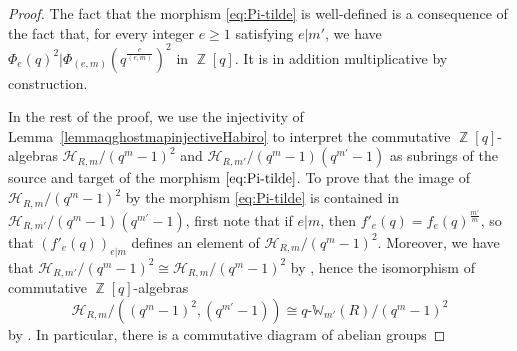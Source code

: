 \documentclass[10pt,twoside]{scrarticle}
\theoremstyle{definition}
\DeclareMathOperator{\Z}{\mathbb{Z}}
\newcommand{\qWmm}{q\text{-}\mathbb{W}_{m'}}
\renewcommand{\ge}{\geqslant}
\numberwithin{equation}{theorem}
\begin{document}
\begin{proof}
    The fact that the morphism \eqref{eq:Pi-tilde} is well-defined is a consequence of the fact that, for every integer $e \ge 1$ satisfying $e|m'$, we have $\Phi_e(q)^2|\Phi_{(e,m)}(q^{\frac{e}{(e,m)}})^2$ in $\Z[q]$. It is in addition multiplicative by construction. 
    
    In the rest of the proof, we use the injectivity of Lemma~\ref{lemmaqghostmapinjectiveHabiro} to interpret the commutative $\Z[q]$\nobreakdash-algebras \hbox{$\mathcal{H}_{R,m}/(q^m-1)^2$} and $\mathcal{H}_{R,m'}/(q^m-1)(q^{m'}-1)$ as subrings of the source and target of the morphism $\eqref{eq:Pi-tilde}$. 
    To prove that the image of $\mathcal{H}_{R,m}/(q^m-1)^2$ by the morphism \eqref{eq:Pi-tilde} is contained in $\mathcal{H}_{R,m'}/(q^m-1)(q^{m'}-1)$, first note that if $e|m$, then $f'_e(q) = f_e(q)^{\frac{m'}{m}}$, so that $(f'_e(q))_{e|m}$ defines an element of $\mathcal{H}_{R,m}/(q^m-1)^2$. 
    Moreover, we have that $\mathcal{H}_{R,m'}/(q^m-1)^2 \cong \mathcal{H}_{R,m}/(q^m-1)^2$ by \cite[2.7]{wagner_q-hodge_2025}, hence the isomorphism of commutative $\Z[q]$-algebras $$\mathcal{H}_{R,m}/((q^m-1)^2,(q^{m'}-1)) \cong \qWmm(R)/(q^m-1)^2$$ 
    by \cite[Theorem~$2.9$]{wagner_q-hodge_2025}.
    In particular, there is a commutative diagram of abelian groups
    

\end{proof}
\end{document}
